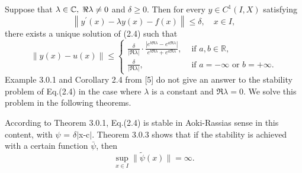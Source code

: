 \documentclass[a4paper,12pt]{report}
\begin{document}
\begin{cor}
	Suppose that $\lambda \in \mathbb{C}, \hspace{0.1cm} \Re \lambda \neq 0$ and $\delta \ge 0$. Then for every $y \in C^{1}(I, X)$ satisfying
	$$\left\|y^{\prime}(x)-\lambda y(x)-f(x)\right\| \le \delta, \quad x \in I,$$
	there exists a unique solution of (2.4) such that 
	$$\|y(x)-u(x)\| \le \begin{cases}\frac{\delta}{\vert \Re \lambda \vert} \cdot \frac{\left|e^{b \Re \lambda}-e^{a \Re \lambda}\right|}{e^{b \Re \lambda}+e^{a \Re \lambda}}, & \text { if } a, b \in \mathbb{R}, \\ \frac{\delta}{\mid \Re \lambda \vert}, & \text { if } a=-\infty \text { or } b=+\infty .\end{cases} $$
	Example 3.0.1 and Corollary 2.4 from [5] do not give an answer to the stability problem of Eq.(2.4) in the case where $\lambda$ is a constant and $\Re \lambda=0$. We solve this problem in the following theorems.
\end{cor}
\begin{Rem}
	According to Theorem 3.0.1, Eq.(2.4) is stable in Aoki-Rassias sense in this content, with $\psi$ = $\delta$$\vert$x-c$\vert$. Theorem 3.0.3 shows that if the stability is achieved with a certain function $\bar{\psi}$, then 
	$$\sup _{x \in I}\|\tilde{\psi}(x)\|=\infty.$$
\end{Rem}		
\end{document}
